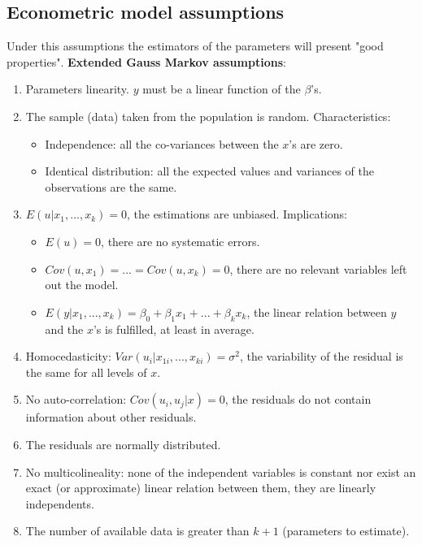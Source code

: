 \documentclass[10pt,landscape]{article}
\begin{document}
\begin{multicols}{3}
\subsection*{Econometric model assumptions}


Under this assumptions the estimators of the parameters will present "good properties". \textbf{Extended Gauss Markov assumptions}:

\begin{enumerate}[leftmargin=*]
\item Parameters linearity. $y$ must be a linear function of the $\beta$'s.
\item The sample (data) taken from the population is random. Characteristics:
\begin{itemize}[leftmargin=*]
\item Independence: all the co-variances between the $x$'s are zero.
\item Identical distribution: all the expected values and variances of the observations are the same.
\end{itemize}
\item $E(u | x_1, ..., x_k) = 0$, the estimations are unbiased. Implications:
\begin{itemize}[leftmargin=*]
\item $E(u) = 0$, there are no systematic errors.
\item $Cov(u, x_1) = ... = Cov(u, x_k) = 0$, there are no relevant variables left out the model.
\item $E(y | x_1, ..., x_k) = \beta_0 + \beta_1 x_1 + ... + \beta_k x_k$, the linear relation between $y$ and the $x$'s is fulfilled, at least in average.
\end{itemize}
\item Homocedasticity: $Var(u_i | x_{1i},  ..., x_{ki}) = \sigma^2$, the variability of the residual is the same for all levels of $x$.
\item No auto-correlation: $Cov(u_i, u_j | x) = 0$, the residuals do not contain information about other residuals.
\item The residuals are normally distributed.
\item No multicolineality: none of the independent variables is constant nor exist an exact (or approximate) linear relation between them, they are linearly independents.
\item The number of available data is greater than $k+1$ (parameters to estimate).
\end{enumerate}


\end{multicols}
\end{document}
